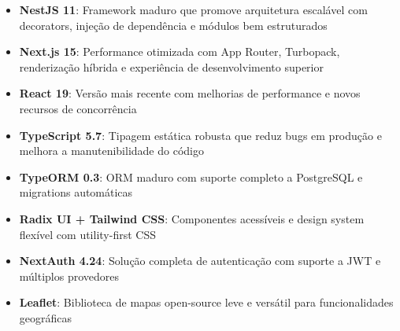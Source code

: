 \begin{itemize}
  \item \textbf{NestJS 11}: Framework maduro que promove arquitetura escalável com decorators, injeção de dependência e módulos bem estruturados
  \item \textbf{Next.js 15}: Performance otimizada com App Router, Turbopack, renderização híbrida e experiência de desenvolvimento superior
  \item \textbf{React 19}: Versão mais recente com melhorias de performance e novos recursos de concorrência
  \item \textbf{TypeScript 5.7}: Tipagem estática robusta que reduz bugs em produção e melhora a manutenibilidade do código
  \item \textbf{TypeORM 0.3}: ORM maduro com suporte completo a PostgreSQL e migrations automáticas
  \item \textbf{Radix UI + Tailwind CSS}: Componentes acessíveis e design system flexível com utility-first CSS
  \item \textbf{NextAuth 4.24}: Solução completa de autenticação com suporte a JWT e múltiplos provedores
  \item \textbf{Leaflet}: Biblioteca de mapas open-source leve e versátil para funcionalidades geográficas
\end{itemize}

